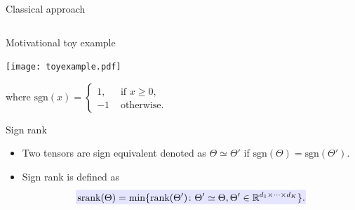 \documentclass[10pt, mathserif]{beamer} %
\theoremstyle{definition}
\theoremstyle{plain}
\begin{document}
\begin{frame}{Classical approach}
\begin{itemize}
{\begin{columns}
\begin{column}{0.5\textwidth}
\end{column}
\end{columns}
    
  }
 \end{itemize}
\end{frame}

\begin{frame}{Motivational toy example}
    \begin{center}
    \texttt{[image: toyexample.pdf]}
    \end{center}
{\footnotesize where $\text{sgn}(x) = \begin{cases}1,&\text{ if } x\geq 0,\\-1 &\text{ otherwise.}\end{cases}$}
\end{frame}



\begin{frame}{Sign rank}
\begin{itemize}
    \item  Two tensors are sign equivalent denoted as $\Theta \simeq \Theta'$ if $\text{sgn}(\Theta) = \text{sgn}(\Theta')$.

    \item Sign rank is defined as
    \begin{align}
    \rlap{\textcolor{blue!10}{\rule[-\dp\strutbox]{235pt}{\baselineskip}}}\,\text{srank}(\Theta) = \min\{\text{rank}(\Theta')\colon \Theta'\simeq \Theta, \Theta'\in\mathbb{R}^{d_1\times\cdots\times d_K}\}.
    \end{align}
\end{itemize}


\end{frame}
\end{document}
